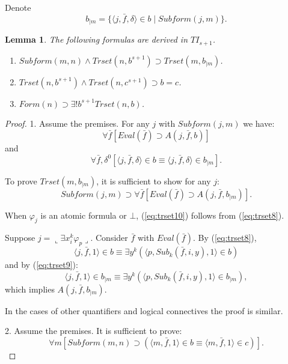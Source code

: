 \documentclass{asl}
\newtheorem{lemma}{Lemma}[section]
\theoremstyle{definition}
\begin{document}
Denote
\[b_{\mid m}=\lbrace\langle j,\bar{f},\delta\rangle\in b\mid Subform(j,m)\rbrace.\]
\begin{lemma}
The following formulas are derived in $TI_{s+1}$.
\begin{enumerate}
\item $Subform(m,n)\wedge Trset(n, b^{s+1})\supset Trset(m, b_{\mid m})$.
\medskip
\item $Trset(n, b^{s+1})\wedge Trset(n, c^{s+1})\supset b=c$.
\medskip
\item $Form(n)\supset\exists !b^{s+1} Trset(n,b)$.
\end{enumerate}
\label{lemma:trset8}
\end{lemma}
\begin{proof}
1. Assume the premises. For any $j$ with $Subform(j,m)$ we have:
\begin{equation}
\forall\bar{f}\left[Eval(\bar{f})\supset A(j,\bar{f},b) \right] 
\label{eq:trset8}
\end{equation}
and 
\begin{equation}
\forall\bar{f},\delta^0\left[\langle j,\bar{f},\delta\rangle\in b\equiv\langle j,\bar{f},\delta\rangle\in b_{\mid m} \right]. 
\label{eq:trset9}
\end{equation}

To prove $Trset(m,b_{\mid m})$, it is sufficient to show for any $j$:
\begin{equation}
Subform(j,m)\supset\forall\bar{f}\left[Eval(\bar{f})\supset A(j,\bar{f},b_{\mid m})\right]. 
\label{eq:trset10}
\end{equation}

When $\varphi_j$ is an atomic formula or $\bot$, (\ref{eq:trset10}) follows from (\ref{eq:trset8}). 

Suppose $j=\llcorner\exists x_i^k  \varphi_p\lrcorner$. Consider $\bar{f}$ with $Eval(\bar{f})$. By (\ref{eq:trset8}),
\[\langle j,\bar{f},1\rangle \in b\equiv
\exists y^k\left(\langle p,Sub_k(\bar{f},i,y),1\rangle \in b\right) \]
and by (\ref{eq:trset9}):
\[\langle j,\bar{f},1\rangle \in b_{\mid m}\equiv
\exists y^k\left(\langle p,Sub_k(\bar{f},i,y),1\rangle \in b_{\mid m}\right),\]
which implies $A(j,\bar{f},b_{\mid m})$. 

In the cases of other quantifiers and logical connectives the proof is similar.

2. Assume the premises. It is sufficient to prove:
\begin{equation}
\forall m\left[Subform(m,n)\supset(\langle m,\bar{f},1\rangle\in b\equiv\langle m,\bar{f},1\rangle\in c)\right]. 
\label{eq:trset11}
\end{equation}


\end{proof}
\end{document}
